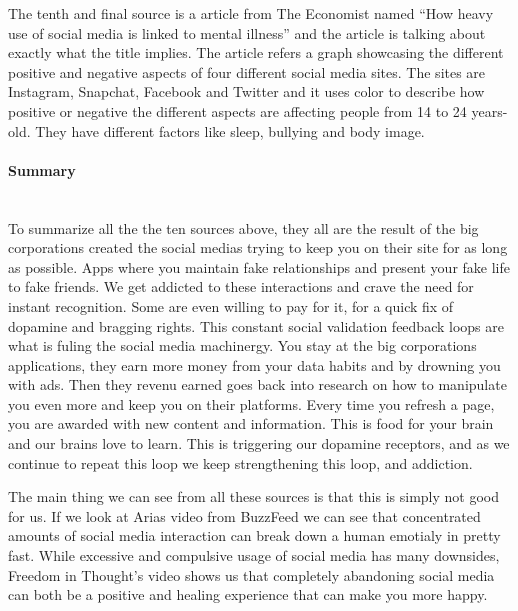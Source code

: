 \documentclass[11pt]{article}
\begin{document}
The tenth and final source \cite{economist} is a article from The Economist named “How
heavy use of social media is linked to mental illness” and the article is talking about
exactly what the title implies. The article refers a graph showcasing the different
positive and negative aspects of four different social media sites. The sites are
Instagram, Snapchat, Facebook and Twitter and it uses color to describe how positive
or negative the different aspects are affecting people from 14 to 24 years-old. They
have different factors like sleep, bullying and body image.

\paragraph{Summary} \hspace{0pt} \\
To summarize all the the ten sources above, they all are the result of the big
corporations created the social medias trying to keep you on their site for as long as
possible. Apps where you maintain fake relationships and present your fake life to fake
friends.  We get addicted to these interactions and crave the need for instant
recognition. Some are even willing to pay for it, for a quick fix of dopamine and
bragging rights. This constant social validation feedback loops are what is fuling the
social media machinergy. You stay at the big corporations applications, they earn more
money from your data habits and by drowning you with ads. Then they revenu earned goes
back into research on how to manipulate you even more and keep you on their platforms.
Every time you refresh a page, you are awarded with new content and information. This
is food for your brain and our brains love to learn. This is triggering our dopamine
receptors, and as we continue to repeat this loop we keep strengthening this loop, and
addiction.

The main thing we can see from all these sources is that this is simply not good for us.
If we look at Arias video from BuzzFeed we can see that concentrated amounts of social
media interaction can break down a human emotialy in pretty fast. While excessive and
compulsive usage of social media has many downsides, Freedom in Thought’s video shows
us that completely abandoning social media can both be a positive and healing experience
that can make you more happy.

\pagebreak


\end{document}
